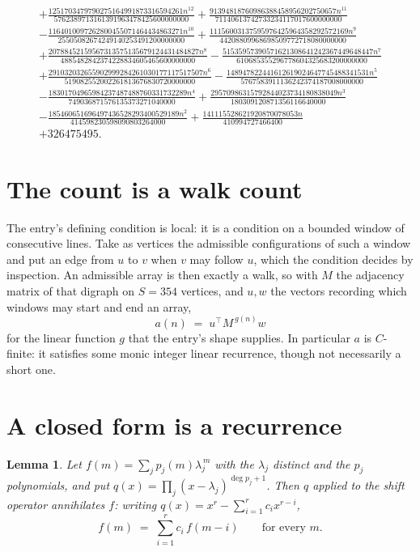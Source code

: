 \documentclass[11pt,a4paper]{article}
\theoremstyle{plain}
\newtheorem{lemma}[theorem]{Lemma}
\theoremstyle{definition}
\begin{document}
\begin{multline*}
+ \frac{1251703479790275164991873316594261 n^{12}}{5762389713161391963478425600000000} + \frac{91394818760986388458956202750657 n^{11}}{71140613742733234117017600000000} \\
- \frac{1164010097262800455071464434863271 n^{10}}{25505082674249140253491200000000} + \frac{11156003137595976425964358292572169 n^{9}}{44208809968698509772718080000000} \\
+ \frac{20788452159567313575135679124431484827 n^{8}}{4885482842374228834605465600000000} - \frac{51535957390571621308641242367449648447 n^{7}}{610685355296778604325683200000000} \\
+ \frac{291032032655902999284261030177117517507 n^{6}}{519082552002261813676830720000000} - \frac{148947822441612619024647745488341531 n^{5}}{5767583911136242374187008000000} \\
- \frac{18301704965984237487488760331732289 n^{4}}{749036871576135373271040000} + \frac{29570986315792844023734180838049 n^{3}}{180309120871356116640000} \\
- \frac{185460651696497436528293400529189 n^{2}}{414598230598090803264000} + \frac{141115528621920870078053 n}{410994727466400} \\
+ 326475495.
\end{multline*}

\section{The count is a walk count}

The entry's defining condition is local: it is a condition on a bounded window of consecutive lines. Take as vertices the
admissible configurations of such a window and put an edge from $u$ to $v$ when $v$ may
follow $u$, which the condition decides by inspection. An admissible array is then exactly a
walk, so with $M$ the adjacency matrix of that digraph on $S=354$ vertices, and $u,w$ the
vectors recording which windows may start and end an array,
\[
a(n)\;=\;u^{\!\top}M^{\,g(n)}w
\]
for the linear function $g$ that the entry's shape supplies. In particular $a$ is
$C$-finite: it satisfies some monic integer linear recurrence, though not necessarily a short
one.

\section{A closed form is a recurrence}

\begin{lemma}\label{lem:ann}
Let $f(m)=\sum_{j}p_j(m)\lambda_j^{\,m}$ with the $\lambda_j$ distinct and the $p_j$
polynomials, and put $q(x)=\prod_j(x-\lambda_j)^{\deg p_j+1}$. Then $q$ applied to the shift
operator annihilates $f$: writing $q(x)=x^{r}-\sum_{i=1}^{r}c_ix^{r-i}$,
\[
f(m)\;=\;\sum_{i=1}^{r}c_i\,f(m-i)\qquad\text{for every }m.
\]
\end{lemma}
\end{document}
